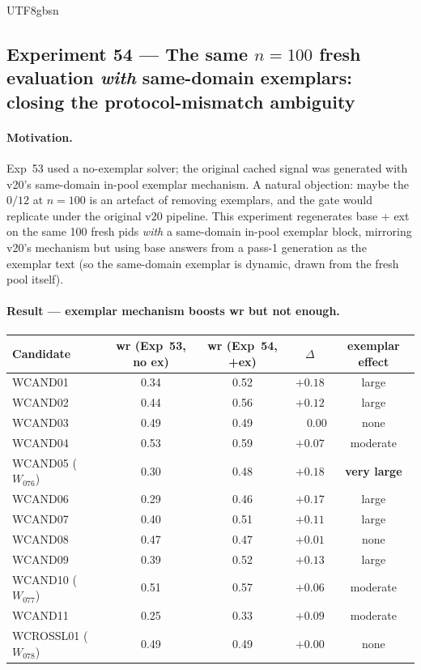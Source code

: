 \documentclass{article}
\begin{document}
\begin{CJK*}{UTF8}{gbsn}
\subsection{Experiment 54 --- The same \(n=100\) fresh evaluation
\emph{with} same-domain exemplars: closing the protocol-mismatch
ambiguity}
\label{sec:exp54}

\paragraph{Motivation.} Exp~53 used a no-exemplar solver; the
original cached signal was generated with v20's same-domain
in-pool exemplar mechanism. A natural objection: maybe the
\(0/12\) at \(n=100\) is an artefact of removing exemplars, and
the gate would replicate under the original v20 pipeline. This
experiment regenerates base + ext on the same 100 fresh pids
\emph{with} a same-domain in-pool exemplar block, mirroring v20's
mechanism but using base answers from a pass-1 generation as the
exemplar text (so the same-domain exemplar is dynamic, drawn
from the fresh pool itself).

\paragraph{Result --- exemplar mechanism boosts wr but not enough.}

\begin{center}\small
\begin{tabular}{l c c c c}
  \toprule
  Candidate & wr (Exp~53, no ex) & wr (Exp~54, +ex) & \(\Delta\) & exemplar effect \\
  \midrule
  WCAND01 & 0.34 & 0.52 & \(+0.18\) & large \\
  WCAND02 & 0.44 & 0.56 & \(+0.12\) & large \\
  WCAND03 & 0.49 & 0.49 & \(\phantom{+}0.00\) & none \\
  WCAND04 & 0.53 & 0.59 & \(+0.07\) & moderate \\
  WCAND05 (\(W_{076}\)) & 0.30 & 0.48 & \(+0.18\) & \textbf{very large} \\
  WCAND06 & 0.29 & 0.46 & \(+0.17\) & large \\
  WCAND07 & 0.40 & 0.51 & \(+0.11\) & large \\
  WCAND08 & 0.47 & 0.47 & \(+0.01\) & none \\
  WCAND09 & 0.39 & 0.52 & \(+0.13\) & large \\
  WCAND10 (\(W_{077}\)) & 0.51 & 0.57 & \(+0.06\) & moderate \\
  WCAND11 & 0.25 & 0.33 & \(+0.09\) & moderate \\
  WCROSSL01 (\(W_{078}\)) & 0.49 & 0.49 & \(+0.00\) & none \\
  \bottomrule
\end{tabular}
\end{center}


\end{CJK*}
\end{document}
